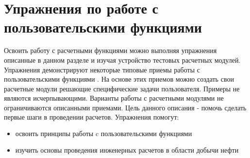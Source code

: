 \chapter{Упражнения по работе с пользовательскими функциями \unf}

Освоить работу с расчетными функциями \unf{} можно выполняя упражнения описанные в данном разделе и изучая устройство тестовых расчетных модулей. Упражнения демонстрируют некоторые типовые приемы работы с пользовательскими функциями \unf{}. На основе этих приемов можно создать свои расчетные модули решающие специфические задачи пользователя. Примеры не являются исчерпывающими. Варианты работы с расчетными модулями \unf{} не ограничиваются описанными приемами. Цель данного описания - помочь сделать первые шаги в проведении расчетов.
Упражнения помогут: 
\begin{itemize}	
	\item 	освоить принципы работы c пользовательскими функциями \unf{} 
	\item 	изучить основы проведения инженерных расчетов в области добычи нефти
\end{itemize}

